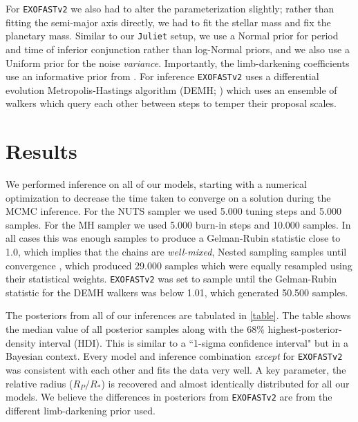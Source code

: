 \documentclass[RNAAS]{aastex631}
\begin{document}
For \texttt{EXOFASTv2} we also had to alter the parameterization slightly; rather than fitting the semi-major axis directly, we had to fit the stellar mass and fix the planetary mass. Similar to our \texttt{Juliet} setup, we use a Normal prior for period and time of inferior conjunction rather than log-Normal priors, and we also use a Uniform prior for the noise \textit{variance}. Importantly, the limb-darkening coefficients use an informative prior from \citet{2011A&A...529A..75C}. For inference \texttt{EXOFASTv2} uses a differential evolution Metropolis-Hastings algorithm (DEMH; \citealp{2006S&C....16..239T}) which uses an ensemble of walkers which query each other between steps to temper their proposal scales.

\section{Results}

We performed inference on all of our models, starting with a numerical optimization to decrease the time taken to converge on a solution during the MCMC inference. For the NUTS sampler we used \num{5,000} tuning steps and \num{5,000} samples. For the MH sampler we used \num{5,000} burn-in steps and \num{10,000} samples. In all cases this was enough samples to produce a Gelman-Rubin statistic close to 1.0, which implies that the chains are \textit{well-mixed}, Nested sampling samples until convergence \citep[see][\S 2.4]{2020MNRAS.493.3132S}, which produced \num{29,000} samples which were equally resampled using their statistical weights. \texttt{EXOFASTv2} was set to sample until the Gelman-Rubin statistic for the DEMH walkers was below 1.01, which generated \num{50,500} samples.

The posteriors from all of our inferences are tabulated in \autoref{table}. The table shows the median value of all posterior samples along with the 68\% highest-posterior-density interval (HDI). This is similar to a ``1-sigma confidence interval" but in a Bayesian context. Every model and inference combination \textit{except} for \texttt{EXOFASTv2} was consistent with each other and fits the data very well. A key parameter, the relative radius ($R_P/R_*$) is recovered and almost identically distributed for all our models. We believe the differences in posteriors from \texttt{EXOFASTv2} are from the different limb-darkening prior used.





{}

\end{document}
